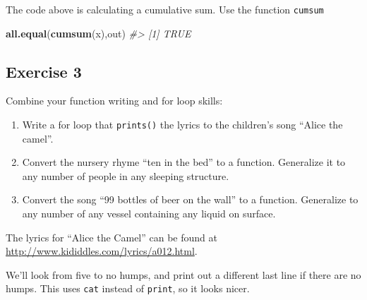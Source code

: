\documentclass[]{book}
\newenvironment{Shaded}{\begin{snugshade}}{\end{snugshade}}
\newcommand{\CommentTok}[1]{\textcolor[rgb]{0.56,0.35,0.01}{\textit{#1}}}
\newcommand{\KeywordTok}[1]{\textcolor[rgb]{0.13,0.29,0.53}{\textbf{#1}}}
\newcommand{\NormalTok}[1]{#1}
\theoremstyle{plain}
\theoremstyle{remark}
\theoremstyle{definition}
\theoremstyle{definition}
\theoremstyle{definition}
\theoremstyle{remark}
\begin{document}
The code above is calculating a cumulative sum. Use the function
\texttt{cumsum}

\begin{Shaded}
\begin{Highlighting}[]
\KeywordTok{all.equal}\NormalTok{(}\KeywordTok{cumsum}\NormalTok{(x),out)}
\CommentTok{#> [1] TRUE}
\end{Highlighting}
\end{Shaded}

\hypertarget{exercise-3-44}{%
\subsection{Exercise 3}\label{exercise-3-44}}

Combine your function writing and for loop skills:

\begin{enumerate}
\def\labelenumi{\arabic{enumi}.}
\item
  Write a for loop that \texttt{prints()} the lyrics to the children's
  song ``Alice the camel''.
\item
  Convert the nursery rhyme ``ten in the bed'' to a function. Generalize
  it to any number of people in any sleeping structure.
\item
  Convert the song ``99 bottles of beer on the wall'' to a function.
  Generalize to any number of any vessel containing any liquid on
  surface.
\end{enumerate}

The lyrics for ``Alice the Camel'' can be found at
\url{http://www.kididdles.com/lyrics/a012.html}.

We'll look from five to no humps, and print out a different last line if
there are no humps. This uses \texttt{cat} instead of \texttt{print}, so
it looks nicer.
\end{document}

